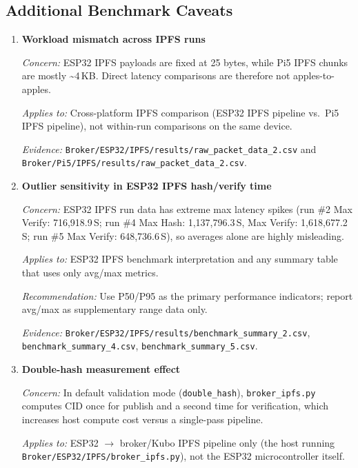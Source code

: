 \documentclass[11pt,letterpaper]{article}
\newcommand{\us}{\textmu{}S}   %
\newcommand{\code}[1]{\texttt{#1}}
\begin{document}
\subsection*{Additional Benchmark Caveats}

\begin{enumerate}

\item \textbf{Workload mismatch across IPFS runs}

  \textit{Concern:} ESP32 IPFS payloads are fixed at 25 bytes, while Pi5 IPFS
  chunks are mostly \textasciitilde{}4\,KB.  Direct latency comparisons are
  therefore not apples-to-apples.

  \textit{Applies to:} Cross-platform IPFS comparison (ESP32 IPFS pipeline
  vs.\ Pi5 IPFS pipeline), not within-run comparisons on the same device.

  \textit{Evidence:} \code{Broker/ESP32/IPFS/results/raw\_packet\_data\_2.csv}
  and \code{Broker/Pi5/IPFS/results/raw\_packet\_data\_2.csv}.

\item \textbf{Outlier sensitivity in ESP32 IPFS hash/verify time}

  \textit{Concern:} ESP32 IPFS run data has extreme max latency spikes
  (run \#2 Max Verify: 716,918.9\,\us{}; run \#4 Max Hash: 1,137,796.3\,\us{},
  Max Verify: 1,618,677.2\,\us{}; run \#5 Max Verify: 648,736.6\,\us{}),
  so averages alone are highly misleading.

  \textit{Applies to:} ESP32 IPFS benchmark interpretation and any summary
  table that uses only avg/max metrics.

  \textit{Recommendation:} Use P50/P95 as the primary performance indicators;
  report avg/max as supplementary range data only.

  \textit{Evidence:} \code{Broker/ESP32/IPFS/results/benchmark\_summary\_2.csv},
  \code{benchmark\_summary\_4.csv}, \code{benchmark\_summary\_5.csv}.

\item \textbf{Double-hash measurement effect}

  \textit{Concern:} In default validation mode (\code{double\_hash}),
  \code{broker\_ipfs.py} computes CID once for publish and a second time for
  verification, which increases host compute cost versus a single-pass pipeline.

  \textit{Applies to:} ESP32 $\rightarrow$ broker/Kubo IPFS pipeline only
  (the host running \code{Broker/ESP32/IPFS/broker\_ipfs.py}), not the ESP32
  microcontroller itself.


\end{enumerate}
\end{document}
